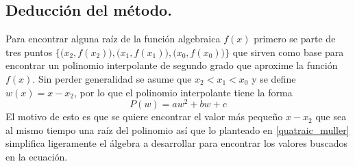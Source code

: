 \subsection{Deducción del método.}
Para encontrar alguna raíz de la función algebraica $f(x)$ primero 
se parte de tres puntos $\bigl\{\bigl(x_2,f(x_2)\bigr),\bigl(x_1,f(x_1)\bigr),\bigl(x_0,f(x_0)\bigr)\bigr\}$ que sirven como base para 
encontrar un polinomio interpolante de segundo grado que aproxime la función
$f(x)$. Sin perder generalidad se asume que $x_2<x_1<x_0$ y se define $w(x)=x-x_2$, por lo
que el polinomio interpolante tiene la forma
\begin{equation}
    \label{quatraic_muller}
    P(w)=aw^2+bw+c
\end{equation}
El motivo de esto es que se quiere encontrar el valor más pequeño $x-x_2$ que sea al mismo tiempo
una raíz del polinomio así que lo planteado en \ref{quatraic_muller} simplifica ligeramente
el álgebra a desarrollar para encontrar los valores buscados en la ecuación.\\

